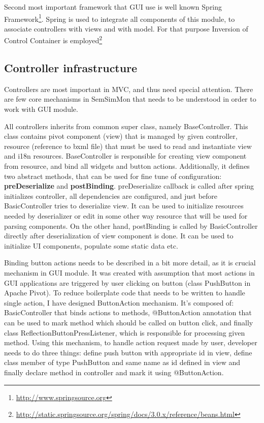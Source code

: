 Second most important framework that GUI use is well known Spring Framework\footnote{\url{http://www.springsource.org}}. Spring is used to integrate all components of this module, to associate controllers with views and with model. For that purpose Inversion of Control Container is
employed\footnote{\url{http://static.springsource.org/spring/docs/3.0.x/reference/beans.html}}

\subsection{Controller infrastructure}

Controllers are most important in MVC, and thus need special attention. There are few core mechanisms in
SemSimMon that needs to be understood in order to work with GUI module. 

All controllers inherits from common super class, namely BaseController. This class contains pivot component (view)
that is managed by given controller, resource (reference to bxml file) that must be used to read and instantiate view and i18n resources. 
BaseController is responsible for creating view component from resource, and bind all widgets and button actions. Additionally,
it defines two abstract methods, that can be used for fine tune of configuration: \textbf{preDeserialize} and
\textbf{postBinding}. preDeserialize callback is called after spring initializes controller, all dependencies are
configured, and just before BasicController tries to deserialize view. It can be used to initialize resources
needed by deserializer or edit in some other way resource that will be used for parsing components. On the other hand,
postBinding is called by BasicController directly after deserialization of view component is done. It can be used to initialize UI components,
populate some static data etc.

Binding button actions needs to be described in a bit more detail, as it is crucial mechanism in GUI module. It was created with
assumption that most actions in GUI applications are triggered by user clicking on button (class PushButton in Apache
Pivot). To reduce boilerplate code that needs to be written to handle single action, I have designed ButtonAction
mechanism. It's composed of: BasicController that binds actions to methods, @ButtonAction annotation that can be used
to mark method which should be called on button click, and finally class ReflectionButtonPressListener, which is
responsible for processing given method. Using this mechanism, to handle action request made by user, developer needs
to do three things: define push button with appropriate id in view, define class member of type PushButton and same
name as id defined in view and finally declare method in controller and mark it using @ButtonAction. 

